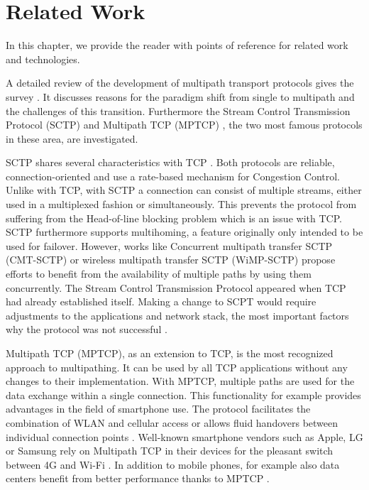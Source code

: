 \chapter{Related Work}
\label{chap:RelatedWork}

In this chapter, we provide the reader with points of reference for related work and technologies. %

A detailed review of the development of multipath transport protocols gives the survey \cite{MultiPathSurvey}. It discusses reasons for the paradigm shift from single to multipath and the challenges of this transition. Furthermore the Stream Control Transmission Protocol (SCTP) \cite{SCTPWiki, rfc4960} and Multipath TCP (MPTCP) \cite{Barre2011, Raiciu2012, MPTCPWebMain,rfc6824}, the two most famous protocols in these area, are investigated.

SCTP shares several characteristics with TCP \cite{rfc793}. Both protocols are reliable, connection-oriented and use a rate-based mechanism for Congestion Control. Unlike with TCP, with SCTP a connection can consist of multiple streams, either used in a multiplexed fashion or simultaneously. This prevents the protocol from suffering from the Head-of-line blocking problem \cite{HOLBlocking} which is an issue with TCP. SCTP furthermore supports multihoming, a feature originally only intended to be used for failover. However, works like Concurrent multipath transfer SCTP (CMT-SCTP) \cite{1709949} or wireless multipath transfer SCTP (WiMP-SCTP) \cite{8205908} propose efforts to benefit from the availability of multiple paths by using them concurrently. The Stream Control Transmission Protocol appeared when TCP had already established itself. Making a change to SCPT would require adjustments to the applications and network stack, the most important factors why the protocol was not successful \cite{WhyNotSCTP}.

Multipath TCP (MPTCP), as an extension to TCP, is the most recognized approach to multipathing. It can be used by all TCP applications without any changes to their implementation. With MPTCP, multiple paths are used for the data exchange within a single connection. This functionality for example provides advantages in the field of smartphone use. The protocol facilitates the combination of WLAN and cellular access \cite{MPTCPStudyWirelessAndCellular} or allows fluid handovers between individual connection points \cite{MPTCPStudyHandover}. Well-known smartphone vendors such as Apple, LG or Samsung rely on Multipath TCP in their devices for the pleasant switch between 4G and Wi-Fi \cite{MPTCPInSmartphones}. In addition to mobile phones, for example also data centers benefit from better performance thanks to MPTCP \cite{RBPGWH11}.

